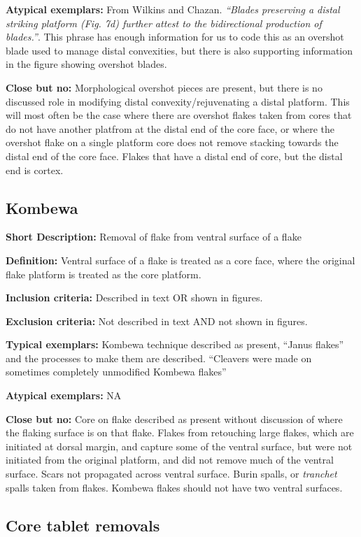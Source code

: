 \documentclass[
]{article}
\begin{document}
\textbf{Atypical exemplars:} From Wilkins and Chazan. \emph{``Blades
preserving a distal striking platform (Fig. 7d) further attest to the
bidirectional production of blades.''}. This phrase has enough
information for us to code this as an overshot blade used to manage
distal convexities, but there is also supporting information in the
figure showing overshot blades.

\textbf{Close but no:} Morphological overshot pieces are present, but
there is no discussed role in modifying distal convexity/rejuvenating a
distal platform. This will most often be the case where there are
overshot flakes taken from cores that do not have another platfrom at
the distal end of the core face, or where the overshot flake on a single
platform core does not remove stacking towards the distal end of the
core face. Flakes that have a distal end of core, but the distal end is
cortex.

\subsection{Kombewa}\label{kombewa}

\textbf{Short Description:} Removal of flake from ventral surface of a
flake

\textbf{Definition:} Ventral surface of a flake is treated as a core
face, where the original flake platform is treated as the core platform.

\textbf{Inclusion criteria:} Described in text OR shown in figures.

\textbf{Exclusion criteria:} Not described in text AND not shown in
figures.

\textbf{Typical exemplars:} Kombewa technique described as present,
``Janus flakes'' and the processes to make them are described.
``Cleavers were made on sometimes completely unmodified Kombewa flakes''

\textbf{Atypical exemplars:} NA

\textbf{Close but no:} Core on flake described as present without
discussion of where the flaking surface is on that flake. Flakes from
retouching large flakes, which are initiated at dorsal margin, and
capture some of the ventral surface, but were not initiated from the
original platform, and did not remove much of the ventral surface. Scars
not propagated across ventral surface. Burin spalls, or \emph{tranchet}
spalls taken from flakes. Kombewa flakes should not have two ventral
surfaces.

\subsection{Core tablet removals}\label{core-tablet-removals}
\end{document}
